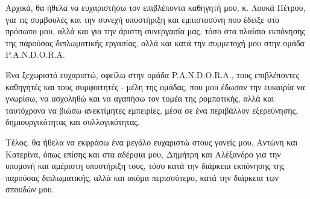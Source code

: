 \documentclass[
11pt, %
twoside, %
english,
headsepline, %
]{MastersDoctoralThesis} %
\begin{document}
\begin{abstract}
\bigskip
The evaluation and verification of the functionality of the above algorithms and systems of the developed robotic vehicle, was conducted via a series of experiments, using 2D and 3D simulation, as well as real world conditions with the actual robotic vehicle.

\begin{flushright}
{\normalsize Kouros Georgios \par} %
{\normalsize Electrical and Computer Engineering Department \par} %
{\normalsize Aristotle University of Thessaloniki, Greece \par} %
{\normalsize \monthyeardate\today}
\end{flushright}

\end{abstract}


\begin{acknowledgements}

\bigskip
Αρχικά, θα ήθελα να ευχαριστήσω τον επιβλέποντα καθηγητή μου, κ. Λουκά Πέτρου, για τις συμβουλές και την συνεχή υποστήριξη και εμπιστοσύνη που έδειξε στο πρόσωπο μου, αλλά και για την άριστη συνεργασία μας, τόσο στα πλαίσια εκπόνησης της παρούσας διπλωματικής εργασίας, αλλά και κατά την συμμετοχή μου στην ομάδα P.A.N.D.O.R.A.

\bigskip
Ένα ξεχωριστό ευχαριστώ, οφείλω στην ομάδα P.A.N.D.O.R.A., τους επιβλέποντες καθηγητές και τους συμφοιτητές - μέλη της ομάδας, που μου έδωσαν την ευκαιρία να γνωρίσω, να ασχοληθώ και να αγαπήσω τον τομέα της ρομποτικής, αλλά και ταυτόχρονα να βιώσω ανεκτίμητες εμπειρίες, μέσα σε ένα περιβάλλον εξερεύνησης, δημιουργικότητας και συλλογικότητας.

\bigskip
Τέλος, θα ήθελα να εκφράσω ένα μεγάλο ευχαριστώ στους γονείς μου, Αντώνη και Κατερίνα, όπως
επίσης και στα αδέρφια μου, Δημήτρη και Αλέξανδρο για την υπομονή και αμέριστη υποστήριξη 
τους, τόσο κατά την διάρκεια εκπόνησης της παρούσας διπλωματικής, αλλά και ακόμα περισσότερο, 
κατά την διάρκεια των σπουδών μου.

\end{acknowledgements}
\end{document}
